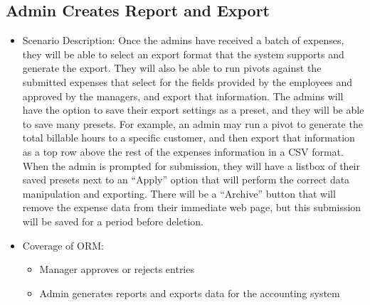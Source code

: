 \documentclass[12pt]{article}
\begin{document}
\subsection{ Admin Creates Report and Export}
\begin{itemize}
\item Scenario Description: 
Once the admins have received a batch of expenses, they will be able to select an export format that the system supports and generate the export. They will also be able to run pivots against the submitted expenses that select for the fields provided by the employees and approved by the managers, and export that information. The admins will have the option to save their export settings as a preset, and they will be able to save many presets. For example, an admin may run a pivot to generate the total billable hours to a specific customer, and then export that information as a top row above the rest of the expenses information in a CSV format. When the admin is prompted for submission, they will have a listbox of their saved presets next to an “Apply” option that will perform the correct data manipulation and exporting. There will be a “Archive” button that will remove the expense data from their immediate web page, but this submission will be saved for a period before deletion.
\item Coverage of ORM:
\begin{itemize}
\item Manager approves or rejects entries\\
\item Admin generates reports and exports data for the accounting system
\end{itemize}
\end{itemize}
\end{document}
